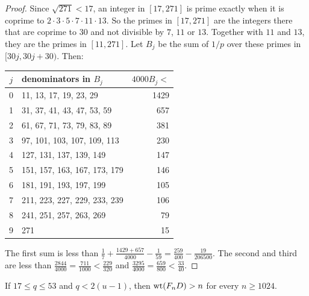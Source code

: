 \begin{proof}
Since $\sqrt{271}<17$, an integer in $[17,271]$ is prime exactly when it is coprime to $2\cdot3\cdot5\cdot7\cdot11\cdot13$. So the primes in $[17,271]$ are the integers there that are coprime to $30$ and not divisible by $7$, $11$ or $13$. Together with $11$ and $13$, they are the primes in $[11,271]$. Let $B_j$ be the sum of $1/p$ over these primes in $[30j,30j+30)$. Then:

\smallskip
\begin{center}\small
\begin{tabular}{c|l|r}
$j$&denominators in $B_j$&$4000B_j<$\\\hline
0&11, 13, 17, 19, 23, 29&1429\\
1&31, 37, 41, 43, 47, 53, 59&657\\
2&61, 67, 71, 73, 79, 83, 89&381\\
3&97, 101, 103, 107, 109, 113&230\\
4&127, 131, 137, 139, 149&147\\
5&151, 157, 163, 167, 173, 179&146\\
6&181, 191, 193, 197, 199&105\\
7&211, 223, 227, 229, 233, 239&106\\
8&241, 251, 257, 263, 269&79\\
9&271&15
\end{tabular}
\end{center}
\smallskip

The first sum is less than $\frac17+\frac{1429+657}{4000}-\frac1{59}=\frac{259}{400}-\frac{19}{206500}$. The second and third are less than $\frac{2844}{4000}=\frac{711}{1000}<\frac{229}{320}$ and $\frac{3295}{4000}=\frac{659}{800}<\frac{33}{40}$.
\end{proof}

\begin{lemma}\label{lem:five-bands}
If $17\le q\le53$ and $q<2(u-1)$, then $\operatorname{wt}(F_nD)>n$ for every $n\ge1024$.
\end{lemma}


